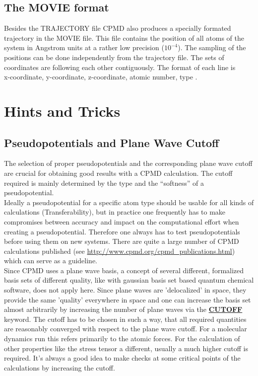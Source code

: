 \documentclass[twoside,10pt,titlepage,a4paper]{article}
\newcommand{\referto}[2]{\hyperlink{#1}{#2}}
\newcommand{\referto}[2]{\htmlref{#2}{#1}}
\newcommand{\htref}[2]{\href{#1}{#2}}
\newcommand{\htref}[2]{\htmladdnormallink{#2}{#1}}
\newcommand{\refkeyword}[1]{%
\referto{#1}{\textbf{#1}}%
\index{#1}%
}%
\begin{document}
\subsection{The MOVIE format}

Besides the TRAJECTORY file CPMD also produces a specially
formated trajectory in the MOVIE file. This file contains the position
of all atoms of the system in Angstrom units at a rather low
precision ($10^{-4}$). The sampling of the positions can be done
independently from the trajectory file. The sets of coordinates are
following each other contiguously. The format of each line is \\[10pt]
x-coordinate, y-coordinate, z-coordinate, atomic number, type .


\clearpage
\section{Hints and Tricks}\label{hints}

\subsection{Pseudopotentials and Plane Wave Cutoff}\label{hints:cutoff}
The selection of proper pseudopotentials and the corresponding
plane wave cutoff are crucial for obtaining good results with
a CPMD calculation. The cutoff required is mainly determined by
the type and the ``softness'' of a pseudopotential.\\
Ideally a pseudopotential for a specific atom type should be
usable for all kinds of calculations (Transferability), but in
practice one frequently has to make compromises between accuracy
and impact on the computational effort when creating a pseudopotential.
Therefore one always has to test pseudopotentials before using them
on new systems. There are quite a large number of CPMD calculations
published (see
\htref{http://www.cpmd.org/cpmd_publications.html}{http://www.cpmd.org/cpmd\_publications.html})
which can serve as a guideline.\\

Since CPMD uses a plane wave basis, a concept of several different,
formalized basis sets of different quality, like with gaussian basis set
based quantum chemical software, does not apply here.
Since plane waves are 'delocalized' in space, they provide the same
'quality' everywhere in space and one can increase the basis set almost
arbitrarily by increasing the number of plane waves via the
\refkeyword{CUTOFF} keyword.  The cutoff has to be chosen
in such a way, that all required quantities are reasonably converged
with respect to the plane wave cutoff. For a molecular dynamics
run this refers primarily to the atomic forces. For the calculation
of other properties like the stress tensor a different, usually a much
higher cutoff is required. It's always a good idea to make checks at
some critical points of the calculations by increasing the cutoff.\\
\end{document}
